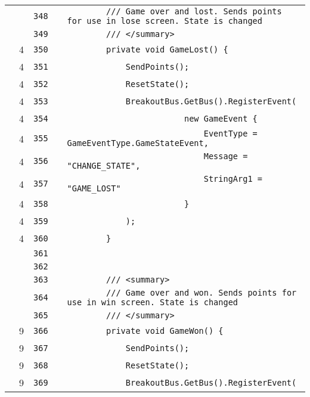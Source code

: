 \documentclass[a4paper,landscape,10pt]{article}
\begin{document}
\begin{longtable}[l]{lrrll}
\cellcolor{gray} &  & \verb~348~ & & \verb~        /// Game over and lost. Sends points for use in lose screen. State is changed~\\
\cellcolor{gray} &  & \verb~349~ & & \verb~        /// </summary>~\\
\cellcolor{green} & 4 & \verb~350~ & & \verb~        private void GameLost() {~\\
\cellcolor{green} & 4 & \verb~351~ & & \verb~            SendPoints();~\\
\cellcolor{green} & 4 & \verb~352~ & & \verb~            ResetState();~\\
\cellcolor{green} & 4 & \verb~353~ & & \verb~            BreakoutBus.GetBus().RegisterEvent(~\\
\cellcolor{green} & 4 & \verb~354~ & & \verb~                        new GameEvent {~\\
\cellcolor{green} & 4 & \verb~355~ & & \verb~                            EventType = GameEventType.GameStateEvent,~\\
\cellcolor{green} & 4 & \verb~356~ & & \verb~                            Message = "CHANGE_STATE",~\\
\cellcolor{green} & 4 & \verb~357~ & & \verb~                            StringArg1 = "GAME_LOST"~\\
\cellcolor{green} & 4 & \verb~358~ & & \verb~                        }~\\
\cellcolor{green} & 4 & \verb~359~ & & \verb~            );~\\
\cellcolor{green} & 4 & \verb~360~ & & \verb~        }~\\
\cellcolor{gray} &  & \verb~361~ & & \verb~~\\
\cellcolor{gray} &  & \verb~362~ & & \verb~~\\
\cellcolor{gray} &  & \verb~363~ & & \verb~        /// <summary>~\\
\cellcolor{gray} &  & \verb~364~ & & \verb~        /// Game over and won. Sends points for use in win screen. State is changed~\\
\cellcolor{gray} &  & \verb~365~ & & \verb~        /// </summary>~\\
\cellcolor{green} & 9 & \verb~366~ & & \verb~        private void GameWon() {~\\
\cellcolor{green} & 9 & \verb~367~ & & \verb~            SendPoints();~\\
\cellcolor{green} & 9 & \verb~368~ & & \verb~            ResetState();~\\
\cellcolor{green} & 9 & \verb~369~ & & \verb~            BreakoutBus.GetBus().RegisterEvent(~\\

\end{longtable}
\end{document}
